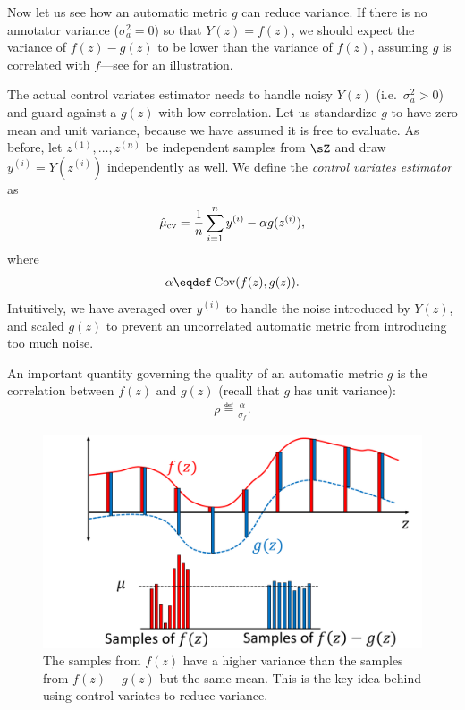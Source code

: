 Now let us see how an automatic metric $g$ can reduce variance.
If there is no annotator variance ($\sigma^2_a = 0$) so that $Y(z) = f(z)$,
we should expect the variance of $f(z)-g(z)$ to be lower than the variance of
$f(z)$, assuming $g$ is correlated with $f$---see  for an illustration.

The actual control variates estimator needs to
handle noisy $Y(z)$ (i.e.\ $\sigma^2_a > 0$) and
guard against a $g(z)$ with low correlation.
Let us standardize $g$ to have zero mean and unit variance, because we have
assumed it is free to evaluate.
As before, let $z^{(1)}, \dots, z^{(n)}$ be independent samples from $\sZ$ and
draw $y^{(i)} = Y(z^{(i)})$ independently as well.
We define the \emph{control variates estimator} as
\begin{align}
\hat \mu_\text{cv} = \frac{1}{n} \sum_{i=1}^n y^{(i)} - \alpha g(z^{(i)}),
\end{align}
where
\begin{align}
  \alpha \eqdef \Cov(f(z),g(z)).
\end{align}
Intuitively, we have averaged over $y^{(i)}$ to handle the noise introduced by $Y(z)$, and scaled $g(z)$ to prevent an uncorrelated automatic metric from introducing too much noise.

An important quantity governing the quality of an automatic metric $g$
is the correlation between $f(z)$ and $g(z)$ (recall that $g$ has unit variance):
\begin{align}
\rho \eqdef \frac{\alpha}{\sigma_f}.  %
\end{align}

\begin{figure}
\centering
  \includegraphics[width=0.8\columnwidth]{figures/variance_reduction_extreme}
  \caption[Intuition for control variates]{\label{fig:variance_reduction}
  The samples from $f(z)$ have a higher variance than the samples
  from $f(z)-g(z)$ but the same mean. This is the key idea behind using control variates to reduce variance.}
\end{figure}

